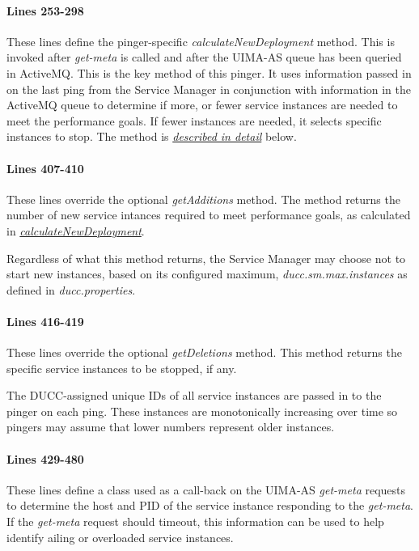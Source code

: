     \paragraph{Lines 253-298}
    These lines define the pinger-specific {\em calculateNewDeployment}
    method.  This is invoked after {\em get-meta} is called and after the
    UIMA-AS queue has been queried in ActiveMQ.  This is the key method of
    this pinger.  It uses information passed in on the last ping from the
    Service Manager in conjunction with information in the ActiveMQ queue
    to determine if more, or fewer service instances are needed to meet the
    performance goals.  If fewer instances are needed, it selects specific
    instances to stop.  The method is 
    \hyperref[subsec:services.calculate-new]{\em described in detail} below.

    \paragraph{Lines 407-410}
    These lines override the optional {\em getAdditions} method.  The method
    returns the number of new service intances required to meet performance
    goals, as calculated in
    \hyperref[subsec:services.calculate-new]{\em calculateNewDeployment}.

    Regardless of what this method returns, the Service Manager may choose
    not to start new instances, based on its configured maximum,
    {\em ducc.sm.max.instances} as defined in {\em ducc.properties}.

    \paragraph{Lines 416-419}
    These lines override the optional {\em getDeletions} method.  This
    method returns the specific service instances to be stopped, if any.
    
    The DUCC-assigned unique IDs of all service instances are passed in to
    the pinger on each ping.  These instances are monotonically increasing
    over time so pingers may assume that lower numbers represent older
    instances.


    \paragraph{Lines 429-480}
    These lines define a class used as a call-back on the UIMA-AS
    {\em get-meta} requests to determine the host and PID of the
    service instance responding to the {\em get-meta}.   If the
    {\em get-meta} request should timeout, this information can be used to
    help identify ailing or overloaded service instances.
    
